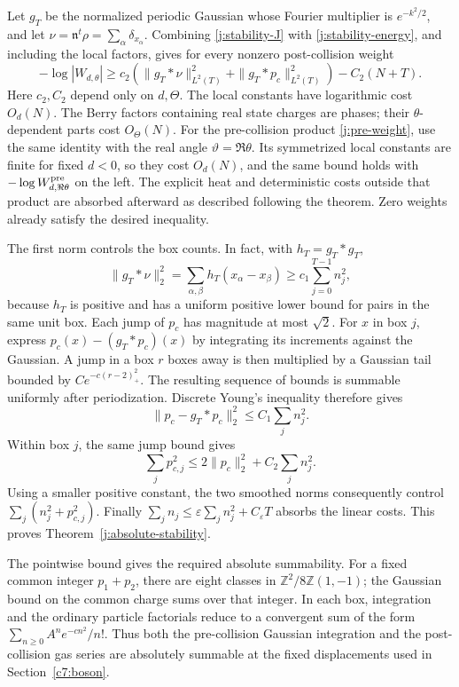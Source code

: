 Let \(g_T\) be the normalized periodic Gaussian whose Fourier multiplier is \(e^{-k^2/2}\), and let
\(\nu=\mathfrak n^t\rho=\sum_\alpha\delta_{x_\alpha}\). Combining \eqref{j:stability-J} with \eqref{j:stability-energy}, and including the local factors, gives for every nonzero post-collision weight
\[
-\log|W_{d,\theta}|
\ge c_2\left(\|g_T*\nu\|_{L^2(T)}^2+\|g_T*p_c\|_{L^2(T)}^2\right)
-C_2(N+T).
\]
Here \(c_2,C_2\) depend only on \(d,\Theta\). The local constants have logarithmic cost \(O_d(N)\). The Berry factors containing real state charges are phases; their \(\theta\)-dependent parts cost \(O_\Theta(N)\). For the pre-collision product \eqref{j:pre-weight}, use the same identity with the real angle \(\vartheta=\Re\theta\). Its symmetrized local constants are finite for fixed \(d<0\), so they cost \(O_d(N)\), and the same bound holds with \(-\log W^{\rm pre}_{d,\Re\theta}\) on the left. The explicit heat and deterministic costs outside that product are absorbed afterward as described following the theorem. Zero weights already satisfy the desired inequality.

The first norm controls the box counts. In fact, with \(h_T=g_T*g_T\),
\[
\|g_T*\nu\|_2^2=\sum_{\alpha,\beta}h_T(x_\alpha-x_\beta)
\ge c_1\sum_{j=0}^{T-1}n_j^2,
\]
because \(h_T\) is positive and has a uniform positive lower bound for pairs in the same unit box. Each jump of \(p_c\) has magnitude at most \(\sqrt2\). For \(x\) in box \(j\), express \(p_c(x)-(g_T*p_c)(x)\) by integrating its increments against the Gaussian. A jump in a box \(r\) boxes away is then multiplied by a Gaussian tail bounded by \(C e^{-c(r-2)_+^2}\). The resulting sequence of bounds is summable uniformly after periodization. Discrete Young's inequality therefore gives
\[
\|p_c-g_T*p_c\|_2^2\le C_1\sum_j n_j^2.
\]
Within box \(j\), the same jump bound gives
\[
\sum_j p_{c,j}^2\le 2\|p_c\|_2^2+C_2\sum_j n_j^2.
\]
Using a smaller positive constant, the two smoothed norms consequently control
\(\sum_j(n_j^2+p_{c,j}^2)\). Finally
\(\sum_j n_j\le\varepsilon\sum_jn_j^2+C_\varepsilon T\)
absorbs the linear costs. This proves Theorem~\ref{j:absolute-stability}.

The pointwise bound gives the required absolute summability. For a fixed common integer \(p_1+p_2\), there are eight classes in \(\mathbb Z^2/8\mathbb Z(1,-1)\); the Gaussian bound on the common charge sums over that integer. In each box, integration and the ordinary particle factorials reduce to a convergent sum of the form \(\sum_{n\ge0}A^n e^{-cn^2}/n!\). Thus both the pre-collision Gaussian integration and the post-collision gas series are absolutely summable at the fixed displacements used in Section~\ref{c7:boson}.
